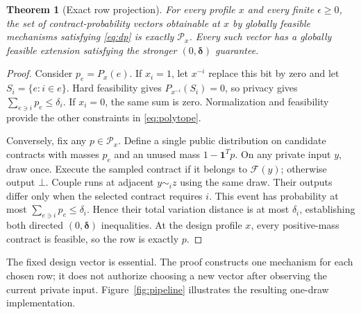 \documentclass[sigconf,nonacm]{aamas}
\newcommand{\F}{\mathcal F}
\newcommand{\PP}{\mathcal P}
\newcommand{\botout}{\bot}
\newcommand{\ind}{\mathbf 1}
\newtheorem{theorem}{Theorem}
\begin{document}
\begin{theorem}[Exact row projection]\label{thm:row}
For every profile $x$ and every finite $\epsilon\geq0$, the set of contract-probability vectors obtainable at $x$ by globally feasible mechanisms satisfying \eqref{eq:dp} is exactly $\PP_x$. Every such vector has a globally feasible extension satisfying the stronger $(0,\boldsymbol\delta)$ guarantee.
\end{theorem}
\begin{proof}
Consider $p_e=P_x(e)$. If $x_i=1$, let $x^{-i}$ replace this bit by zero and let $S_i=\{e:i\in e\}$. Hard feasibility gives $P_{x^{-i}}(S_i)=0$, so privacy gives $\sum_{e\ni i}p_e\leq\delta_i$. If $x_i=0$, the same sum is zero. Normalization and feasibility provide the other constraints in \eqref{eq:polytope}.

Conversely, fix any $p\in\PP_x$. Define a single public distribution on candidate contracts with masses $p_e$ and an unused mass $1-\ind^Tp$. On any private input $y$, draw once. Execute the sampled contract if it belongs to $\F(y)$; otherwise output $\botout$. Couple runs at adjacent $y\sim_i z$ using the same draw. Their outputs differ only when the selected contract requires $i$. This event has probability at most $\sum_{e\ni i}p_e\leq\delta_i$. Hence their total variation distance is at most $\delta_i$, establishing both directed $(0,\boldsymbol\delta)$ inequalities. At the design profile $x$, every positive-mass contract is feasible, so the row is exactly $p$.
\end{proof}

The fixed design vector is essential. The proof constructs one mechanism for each chosen row; it does not authorize choosing a new vector after observing the current private input. Figure~\ref{fig:pipeline} illustrates the resulting one-draw implementation.
\end{document}

